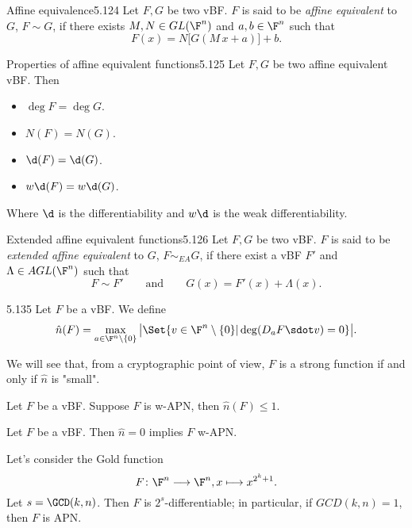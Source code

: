 \begin{defn}{Affine equivalence}{5.124}
	Let \(F,G\) be two vBF. \(F\) is said to be \emph{affine equivalent} to \(G\), \(F\sim G\), if there exists \(M,N\in GL(\F^n)\) and \(a,b\in \F^n\) such that
	\[
		F(x) = N\big[G(M\,x+a)\big]+b.
	\]
\end{defn}

\begin{prop}{Properties of affine equivalent functions}{5.125}
	Let \(F,G\) be two affine equivalent vBF. Then
	\begin{itemize}
		\item \(\deg F = \deg G\).
		\item \(N(F) = N(G)\).
		\item \(\d(F)=\d(G)\).
		\item \(w\d(F) = w\d(G)\).
	\end{itemize}
	Where \(\d\) is the differentiability and \(w\d\) is the weak differentiability.
\end{prop}

\begin{defn}{Extended affine equivalent functions}{5.126}
	Let \(F,G\) be two vBF. \(F\) is said to be \emph{extended affine equivalent} to \(G\), \(F\sim_{EA}G\), if there exist a vBF \(F'\) and \(\Lambda \in AGL(\F^n)\) such that
	\[
		F \sim F' \qquad\text{and}\qquad G(x) = F'(x)+\Lambda(x).
	\]
\end{defn}

\begin{defn}{}{5.135}
	Let \(F\) be a vBF. We define
	\[
		\hat{n}(F) = \max_{a \in \F^n\setminus\{0\}}\big\lvert\Set{v \in \F^n\setminus\{0\} | \deg(D_a F \sdot v) = 0}\big\rvert.
	\]
\end{defn}

\begin{oss}
	We will see that, from a cryptographic point of view, \(F\) is a strong function if and only if \(\hat{n}\) is "small".
\end{oss}

\begin{pr}
	Let \(F\) be a vBF. Suppose \(F\) is w-APN, then \(\hat{n}(F) \le 1\).
\end{pr}

\begin{pr}
	Let \(F\) be a vBF. Then \(\hat{n}=0\) implies \(F\) w-APN.
\end{pr}

\begin{ese}
	Let's consider the Gold function
	\[
		F\colon \F^n \longrightarrow \F^n, x \longmapsto x^{2^k+1}.
	\]
	Let \(s=\GCD(k,n)\). Then \(F\) is \(2^s\)-differentiable; in particular, if \(GCD(k,n)=1\), then \(F\) is APN.
\end{ese}

